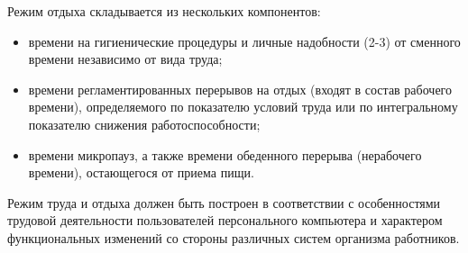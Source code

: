 Режим отдыха складывается из нескольких компонентов:
\begin{itemize}
  \item времени на гигиенические процедуры и личные надобности (2-3) от сменного времени независимо от вида труда;
  \item времени регламентированных перерывов на отдых (входят в состав рабочего времени), определяемого по показателю условий труда или по интегральному показателю снижения работоспособности;
  \item времени микропауз, а также времени обеденного перерыва (нерабочего времени), остающегося от приема пищи.
\end{itemize}

Режим труда и отдыха должен быть построен в соответствии с особенностями трудовой деятельности пользователей персонального компьютера и характером функциональных изменений со стороны различных систем организма работников.

\clearpage
